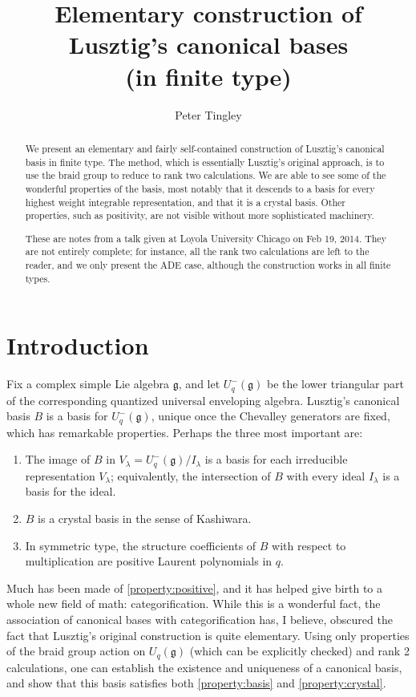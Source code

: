 \documentclass[11pt]{amsart}
\title{Elementary construction of Lusztig's canonical bases \\ (in finite type)}
\author{Peter Tingley}
\numberwithin{equation}{section}
\theoremstyle{definition}
\newcommand{\g}{\mathfrak{g}}
\begin{document}
\maketitle

\begin{abstract}
We present an elementary and fairly self-contained construction of Lusztig's canonical basis in finite type. The method, which is essentially Lusztig's original approach, is to use the braid group to reduce to rank two calculations. We are able to see some of the wonderful properties of the basis, most notably that it descends to a basis for every highest weight integrable representation, and that it is a crystal basis. Other properties, such as positivity, are not visible without more sophisticated machinery. 

These are notes from a talk given at Loyola University Chicago on Feb 19, 2014. They are not entirely complete; for instance, all the rank two calculations are left to the reader, and we only present the ADE case, although the construction works in all finite types. 
\end{abstract}

\tableofcontents

\section{Introduction}
Fix a complex simple Lie algebra $\g$, and let $U^-_q(\g)$ be the lower triangular part of the corresponding quantized universal enveloping algebra. Lusztig's canonical basis $B$ is a basis for $U_q^-(\g)$, unique once the Chevalley generators are fixed, which has remarkable properties. Perhaps the three most important are:
\begin{enumerate}
\item \label{property:basis} The image of $B$ in $V_\lambda = U^-_q(\g)/I_\lambda$ is a basis for each irreducible representation $V_\lambda$; equivalently, the intersection of $B$ with every ideal $I_\lambda$ is a basis for the ideal. 

\item \label{property:crystal} $B$ is a crystal basis in the sense of Kashiwara.

\item \label{property:positive} In symmetric type, the structure coefficients of $B$ with respect to multiplication are positive Laurent polynomials in $q$. 
\end{enumerate}
Much has been made of \eqref{property:positive}, and it has helped give birth to a whole new field of math: categorification. While this is a wonderful fact, the association of canonical bases with categorification has, I believe, obscured the fact that Lusztig's original construction is quite elementary. Using only properties of the braid group action on $U_q(\g)$ (which can be explicitly checked) and rank 2 calculations, one can establish the existence and uniqueness of a canonical basis, and show that this basis satisfies both \eqref{property:basis} and \eqref{property:crystal}. 
\end{document}
